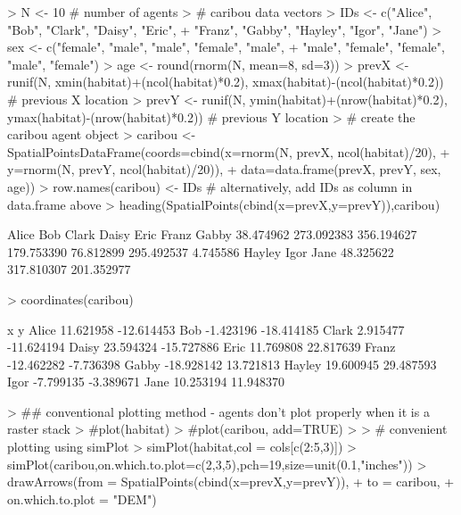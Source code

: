 \documentclass{article}
\begin{document}
\begin{Schunk}
\begin{Sinput}
> N <- 10 # number of agents
> # caribou data vectors
> IDs <- c("Alice", "Bob", "Clark", "Daisy", "Eric",
+          "Franz", "Gabby", "Hayley", "Igor", "Jane")
> sex <- c("female", "male", "male", "female", "male",
+          "male", "female", "female", "male", "female")
> age <- round(rnorm(N, mean=8, sd=3))
> prevX <- runif(N, xmin(habitat)+(ncol(habitat)*0.2), xmax(habitat)-(ncol(habitat)*0.2)) # previous X location
> prevY <- runif(N, ymin(habitat)+(nrow(habitat)*0.2), ymax(habitat)-(nrow(habitat)*0.2)) # previous Y location
> # create the caribou agent object
> caribou <- SpatialPointsDataFrame(coords=cbind(x=rnorm(N, prevX, ncol(habitat)/20),
+                                                y=rnorm(N, prevY, ncol(habitat)/20)),
+                                   data=data.frame(prevX, prevY, sex, age))
> row.names(caribou) <- IDs # alternatively, add IDs as column in data.frame above
> heading(SpatialPoints(cbind(x=prevX,y=prevY)),caribou)
\end{Sinput}
\begin{Soutput}
     Alice        Bob      Clark      Daisy       Eric      Franz      Gabby 
 38.474962 273.092383 356.194627 179.753390  76.812899 295.492537   4.745586 
    Hayley       Igor       Jane 
 48.325622 317.810307 201.352977 
\end{Soutput}
\begin{Sinput}
> coordinates(caribou)
\end{Sinput}
\begin{Soutput}
                x          y
Alice   11.621958 -12.614453
Bob     -1.423196 -18.414185
Clark    2.915477 -11.624194
Daisy   23.594324 -15.727886
Eric    11.769808  22.817639
Franz  -12.462282  -7.736398
Gabby  -18.928142  13.721813
Hayley  19.600945  29.487593
Igor    -7.799135  -3.389671
Jane    10.253194  11.948370
\end{Soutput}
\begin{Sinput}
> ## conventional plotting method - agents don't plot properly when it is a raster stack
> #plot(habitat)
> #plot(caribou, add=TRUE)
> 
> # convenient plotting using simPlot
> simPlot(habitat,col = cols[c(2:5,3)])
> simPlot(caribou,on.which.to.plot=c(2,3,5),pch=19,size=unit(0.1,"inches"))
> drawArrows(from = SpatialPoints(cbind(x=prevX,y=prevY)),
+            to = caribou,
+            on.which.to.plot = "DEM")
\end{Sinput}
\end{Schunk}
\end{document}
